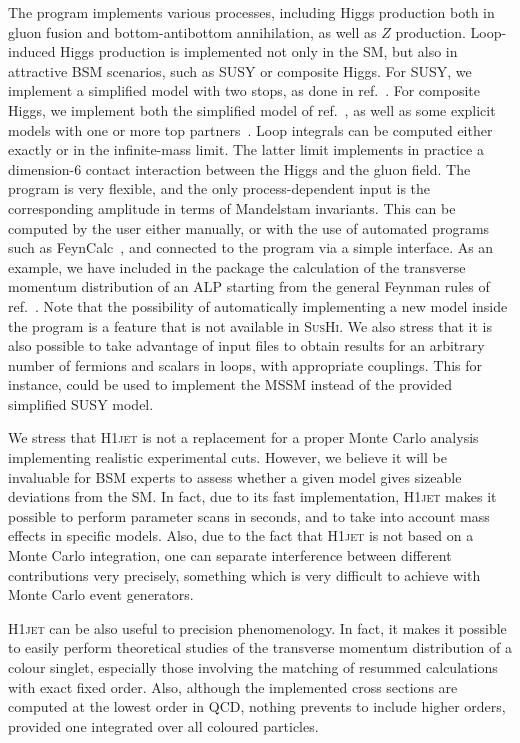 \documentclass[12pt]{article}
\begin{document}
The program implements various processes, including Higgs production
both in gluon fusion and bottom-antibottom annihilation, as well as
$Z$ production. Loop-induced Higgs production is implemented not only
in the SM, but also in attractive BSM scenarios, such as SUSY or
composite Higgs. For SUSY, we implement a simplified model with two
stops, as done in ref.~\cite{Banfi:2018pki}. For composite Higgs, we
implement both the simplified model of ref.~\cite{Banfi:2013yoa}, as
well as some explicit models with one or more top
partners~\cite{Banfi:2019xai}. Loop integrals can be computed either
exactly or in the infinite-mass limit. The latter limit implements in
practice a dimension-6 contact interaction between the Higgs and the
gluon field. The program is very flexible, and the only
process-dependent input is the corresponding amplitude in terms of
Mandelstam invariants. This can be computed by the user either
manually, or with the use of automated programs such as
FeynCalc~\cite{Shtabovenko:2020gxv}, and connected to the program via
a simple interface. As an example, we have included in the package the
calculation of the transverse momentum distribution of an ALP starting
from the general Feynman rules of ref.~\cite{Brivio:2017ije}. Note
that the possibility of automatically implementing a new model inside
the program is a feature that is not available in \textsc{SusHi}. We
also stress that it is also possible to take advantage of input files
to obtain results for an arbitrary number of fermions and scalars in
loops, with appropriate couplings. This for instance, could be used to
implement the MSSM instead of the provided simplified SUSY model.

We stress that \textsc{H1jet} is not a replacement for a proper Monte Carlo
analysis implementing realistic experimental cuts. However, we believe
it will be invaluable for BSM experts to assess whether a given model
gives sizeable deviations from the SM. In fact, due to its fast
implementation, \textsc{H1jet} makes it possible to perform parameter scans in
seconds, and to take into account mass effects in specific
models. Also, due to the fact that \textsc{H1jet} is not based on a Monte Carlo
integration, one can separate interference between different
contributions very precisely, something which is very difficult to
achieve with Monte Carlo event generators.

\textsc{H1jet} can be also useful to precision phenomenology. In fact, it makes
it possible to easily perform theoretical studies of the transverse
momentum distribution of a colour singlet, especially those involving
the matching of resummed calculations with exact fixed order. Also,
although the implemented cross sections are computed at the lowest
order in QCD, nothing prevents to include higher orders, provided one
integrated over all coloured particles.
\end{document}
